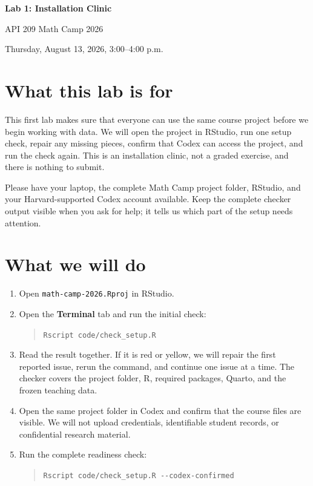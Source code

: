 \documentclass[11pt,letterpaper]{article}
\begin{document}
\begin{center}
  {\Large\bfseries Lab 1: Installation Clinic}\par
  \smallskip
  API 209 Math Camp 2026\par
  Thursday, August 13, 2026, 3:00--4:00 p.m.
\end{center}

\section*{What this lab is for}

This first lab makes sure that everyone can use the same course project before
we begin working with data. We will open the project in RStudio, run one setup
check, repair any missing pieces, confirm that Codex can access the project, and
run the check again. This is an installation clinic, not a graded exercise, and
there is nothing to submit.

Please have your laptop, the complete Math Camp project folder, RStudio, and
your Harvard-supported Codex account available. Keep the complete checker output
visible when you ask for help; it tells us which part of the setup needs
attention.

\section*{What we will do}

\begin{enumerate}
  \setlength{\itemsep}{0.2em}
  \setlength{\parsep}{0pt}
  \setlength{\topsep}{0.3em}
  \item Open \texttt{math-camp-2026.Rproj} in RStudio.
  \item Open the \textbf{Terminal} tab and run the initial check:
    \begin{quote}
      \verb|Rscript code/check_setup.R|
    \end{quote}
  \item Read the result together. If it is red or yellow, we will repair the
    first reported issue, rerun the command, and continue one issue at a time.
    The checker covers the project folder, R, required packages, Quarto, and the
    frozen teaching data.
  \item Open the same project folder in Codex and confirm that the course files
    are visible. We will not upload credentials, identifiable student records,
    or confidential research material.
  \item Run the complete readiness check:
    \begin{quote}
      \verb|Rscript code/check_setup.R --codex-confirmed|
    \end{quote}
\end{enumerate}
\end{document}
